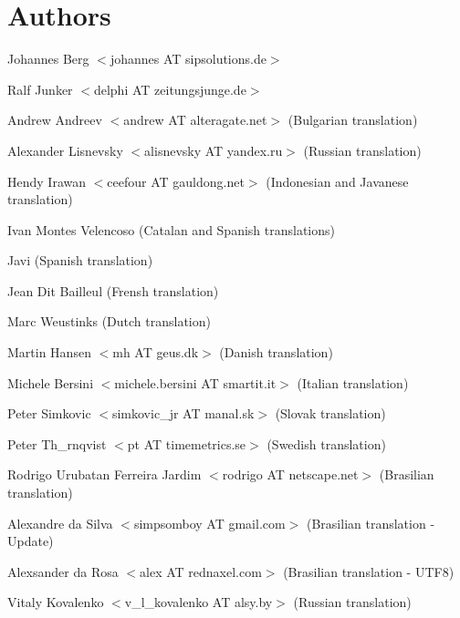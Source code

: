 \documentclass{report}
\begin{document}
\section{Authors}
\par
Johannes Berg {$<$}johannes AT sipsolutions.de{$>$}

\par
Ralf Junker {$<$}delphi AT zeitungsjunge.de{$>$}

\par
Andrew Andreev {$<$}andrew AT alteragate.net{$>$} (Bulgarian translation)

\par
Alexander Lisnevsky {$<$}alisnevsky AT yandex.ru{$>$} (Russian translation)

\par
Hendy Irawan {$<$}ceefour AT gauldong.net{$>$} (Indonesian and Javanese translation)

\par
Ivan Montes Velencoso (Catalan and Spanish translations)

\par
Javi (Spanish translation)

\par
Jean Dit Bailleul (Frensh translation)

\par
Marc Weustinks (Dutch translation)

\par
Martin Hansen {$<$}mh AT geus.dk{$>$} (Danish translation)

\par
Michele Bersini {$<$}michele.bersini AT smartit.it{$>$} (Italian translation)

\par
Peter Simkovic {$<$}simkovic{\_}jr AT manal.sk{$>$} (Slovak translation)

\par
Peter Th{\_}rnqvist {$<$}pt AT timemetrics.se{$>$} (Swedish translation)

\par
Rodrigo Urubatan Ferreira Jardim {$<$}rodrigo AT netscape.net{$>$} (Brasilian translation)

\par
Alexandre da Silva {$<$}simpsomboy AT gmail.com{$>$} (Brasilian translation - Update)

\par
Alexsander da Rosa {$<$}alex AT rednaxel.com{$>$} (Brasilian translation - UTF8)

\par
Vitaly Kovalenko {$<$}v{\_}l{\_}kovalenko AT alsy.by{$>$} (Russian translation)
\end{document}
